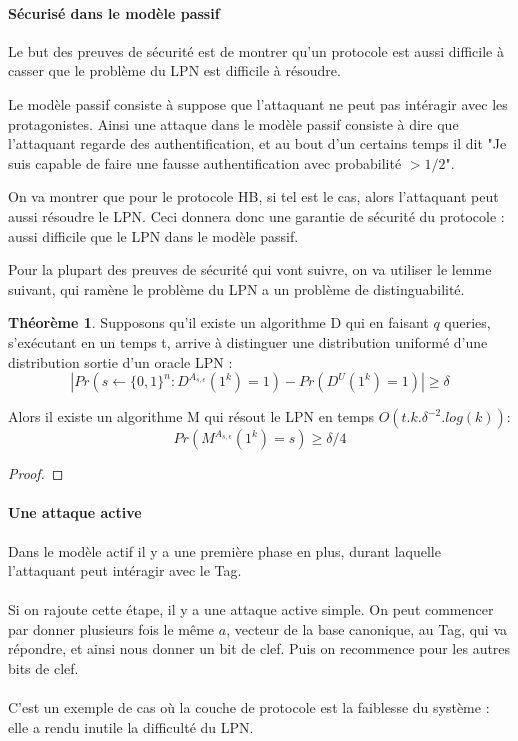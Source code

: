\documentclass{article}		%
\theoremstyle{definition}
\newtheorem{theo}{Théorème}
\theoremstyle{plain}
\theoremstyle{plain}
\theoremstyle{plain}
\theoremstyle{plain}
\begin{document}
\paragraph{Sécurisé dans le modèle passif}
Le but des preuves de sécurité est de montrer qu'un protocole est aussi
difficile à casser que le problème du LPN est difficile à résoudre.

Le modèle passif consiste à suppose que l'attaquant ne peut pas intéragir
avec les protagonistes. Ainsi une attaque dans le modèle passif consiste
à dire que l'attaquant regarde des authentification, et au
bout d'un certains temps il dit "Je suis capable de faire une fausse
authentification avec probabilité $>1/2$".

 On va montrer que pour le protocole HB, si tel est
le cas, alors l'attaquant peut aussi résoudre le LPN. Ceci donnera donc
une garantie de sécurité du protocole : aussi difficile que le LPN dans
le modèle passif.

\begin{framed}
Pour la plupart des preuves de sécurité qui vont suivre, on va utiliser
le lemme suivant, qui ramène le problème du LPN a un problème de
distinguabilité.

\begin{theo}
Supposons qu'il existe un algorithme D qui en faisant $q$ queries,
s'exécutant en un temps t, arrive à distinguer une distribution uniformé
d'une distribution sortie d'un oracle LPN :
$$|Pr(s\leftarrow\{0,1\}^n : D^{A_{s,\epsilon}}(1^k)=1)
-Pr(D^{U}(1^k)=1)|\geq \delta $$

Alors il existe un algorithme M qui résout le LPN en temps
$O(t.k.\delta^{-2}.log(k))$:
$$Pr(M^{A_{s,\epsilon}}(1^k)=s)\geq\delta/4 $$
\end{theo}
\begin{proof}
\end{proof}
\end{framed}



\paragraph{Une attaque active}
Dans le modèle actif il y a une première phase en plus, durant laquelle
l'attaquant peut intéragir avec le Tag.
\\\\
 Si on rajoute cette étape, 
il y a une attaque active simple. On peut commencer par donner plusieurs
fois le même $a$, vecteur de la base canonique, au Tag, qui va répondre,
et ainsi nous donner un bit de clef. Puis on recommence pour les autres
bits de clef.
\\\\ 
C'est un exemple de cas où la couche de protocole est la faiblesse du
système : elle a rendu inutile la difficulté du LPN. 
\end{document}
